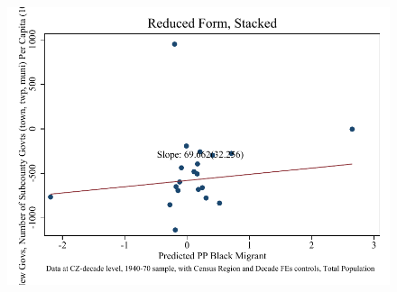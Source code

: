 \documentclass{article}
\begin{document}
\begin{figure}
\centering
\includegraphics{figures/simplefigs/stacked_gen_subcounty_pc_C3_total_rf.pdf}
\end{figure}
\clearpage
\end{document}
